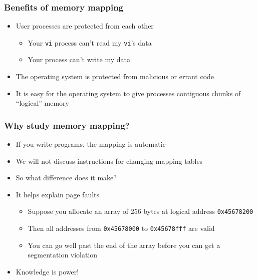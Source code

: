 \documentclass{beamer}
\begin{document}
\begin{frame}
    \frametitle{Benefits of memory mapping}
    \begin{itemize}
        \item User processes are protected from each other
        \begin{itemize}
            \item Your {\tt vi} process can't read my {\tt vi}'s data
            \item Your process can't write my data
        \end{itemize}
        \item The operating system is protected from malicious or errant code
        \item It is easy for the operating system to give processes contiguous
              chunks of ``logical'' memory
    \end{itemize}
\end{frame}

\begin{frame}
    \frametitle{Why study memory mapping?}
    \begin{itemize}
        \item If you write programs, the mapping is automatic
        \item We will not discuss instructions for changing mapping tables
        \item So what difference does it make?
        \item It helps explain page faults
        \begin{itemize}
            \item Suppose you allocate an array of 256 bytes at
                  logical address {\tt 0x45678200}
            \item Then all addresses from {\tt 0x45678000} to
                  {\tt 0x45678fff} are valid
            \item You can go well past the end of the array before
                  you can get a segmentation violation
        \end{itemize}
        \item Knowledge is power!
    \end{itemize}
\end{frame}
\end{document}
